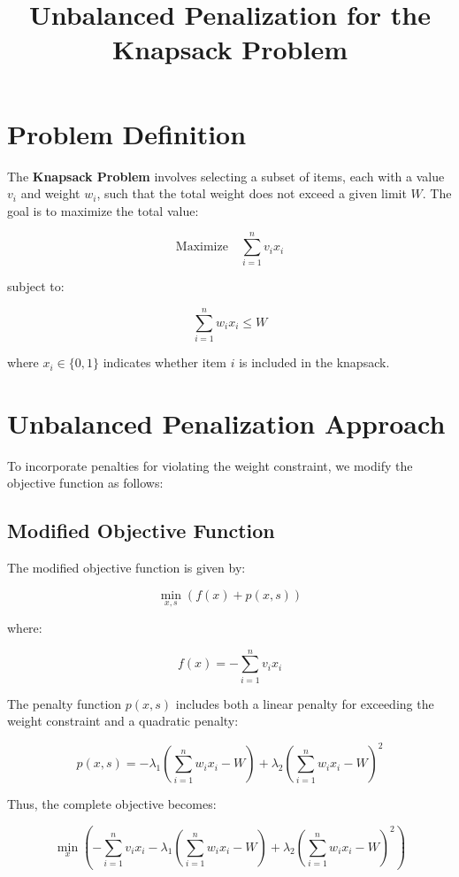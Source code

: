 \documentclass{article}
\begin{document}
\title{Unbalanced Penalization for the Knapsack Problem}
\author{}
\date{}
\maketitle

\section{Problem Definition}

The \textbf{Knapsack Problem} involves selecting a subset of items, each with a value \( v_i \) and weight \( w_i \), such that the total weight does not exceed a given limit \( W \). The goal is to maximize the total value:

\[
\text{Maximize} \quad \sum_{i=1}^{n} v_i x_i
\]

subject to:

\[
\sum_{i=1}^{n} w_i x_i \leq W
\]

where \( x_i \in \{0, 1\} \) indicates whether item \( i \) is included in the knapsack.

\section{Unbalanced Penalization Approach}

To incorporate penalties for violating the weight constraint, we modify the objective function as follows:

\subsection{Modified Objective Function}

The modified objective function is given by:

\[
\min_{x,s} \left( f(x) + p(x,s) \right)
\]

where:

\[
f(x) = -\sum_{i=1}^{n} v_i x_i
\]

The penalty function \( p(x,s) \) includes both a linear penalty for exceeding the weight constraint and a quadratic penalty:

\[
p(x,s) = -\lambda_1 \left( \sum_{i=1}^{n} w_i x_i - W \right) + \lambda_2 \left( \sum_{i=1}^{n} w_i x_i - W \right)^2
\]

Thus, the complete objective becomes:

\[
\min_{x} \left( -\sum_{i=1}^{n} v_i x_i - \lambda_1 \left( \sum_{i=1}^{n} w_i x_i - W \right) + \lambda_2 \left( \sum_{i=1}^{n} w_i x_i - W \right)^2 \right)
\]
\end{document}
